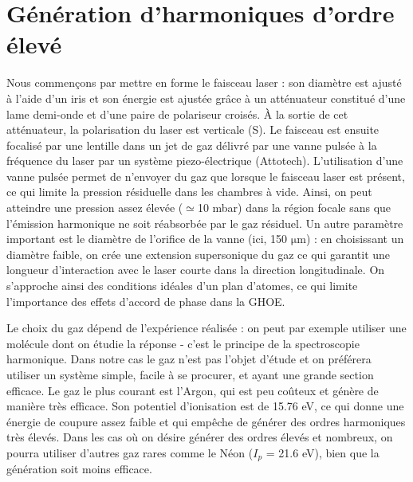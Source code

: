 \section{Génération d'harmoniques d'ordre élevé}
Nous commençons par mettre en forme le faisceau laser : son diamètre est ajusté à l'aide d'un iris et son énergie est ajustée grâce à un atténuateur constitué d'une lame demi-onde et d'une paire de polariseur croisés. \`{A} la sortie de cet atténuateur, la polarisation du laser est verticale (S). Le faisceau est ensuite focalisé par une lentille dans un jet de gaz délivré par une vanne pulsée à la fréquence du laser par un système piezo-électrique (Attotech). L'utilisation d'une vanne pulsée permet de n'envoyer du gaz que lorsque le faisceau laser est présent, ce qui limite la pression résiduelle dans les chambres à vide. Ainsi, on peut atteindre une pression assez élevée ($\simeq$10 mbar) dans la région focale sans que l'émission harmonique ne soit réabsorbée par le gaz résiduel. Un autre paramètre important est le diamètre de l'orifice de la vanne (ici, 150 $\si{\micro\metre}$) : en choisissant un diamètre faible, on crée une extension supersonique du gaz ce qui garantit une longueur d'interaction avec le laser courte dans la direction longitudinale. On s'approche ainsi des conditions idéales d'un plan d'atomes, ce qui limite l'importance des effets d'accord de phase dans la GHOE. \par
Le choix du gaz dépend de l'expérience réalisée : on peut par exemple utiliser une molécule dont on étudie la réponse - c'est le principe de la spectroscopie harmonique. Dans notre cas le gaz n'est pas l'objet d'étude et on préférera utiliser un système simple, facile à se procurer, et ayant une grande section efficace. Le gaz le plus courant est l'Argon, qui est peu coûteux et génère de manière très efficace. Son potentiel d'ionisation est de 15.76 eV, ce qui donne une énergie de coupure assez faible et qui empêche de générer des ordres harmoniques très élevés. Dans les cas où on désire générer des ordres élevés et nombreux, on pourra utiliser d'autres gaz rares comme le Néon ($I_p$ = 21.6 eV), bien que la génération soit moins efficace.

